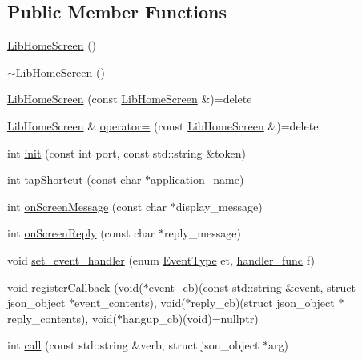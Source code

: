 \subsection*{Public Member Functions}
\begin{DoxyCompactItemize}
\item 
\hyperlink{class_lib_home_screen_a724bd949c4154fad041f96a15ef0f5dc}{Lib\+Home\+Screen} ()
\item 
\hyperlink{class_lib_home_screen_a249902aebf71a5383ca8ec6ae558d095}{$\sim$\+Lib\+Home\+Screen} ()
\item 
\hyperlink{class_lib_home_screen_a0fff2f703c8ce184eb9edd133e0f4137}{Lib\+Home\+Screen} (const \hyperlink{class_lib_home_screen}{Lib\+Home\+Screen} \&)=delete
\item 
\hyperlink{class_lib_home_screen}{Lib\+Home\+Screen} \& \hyperlink{class_lib_home_screen_a23bc17798453cfca50904562736f6b25}{operator=} (const \hyperlink{class_lib_home_screen}{Lib\+Home\+Screen} \&)=delete
\item 
int \hyperlink{class_lib_home_screen_a6a57b573cc767725762ba9beab032220}{init} (const int port, const std\+::string \&token)
\item 
int \hyperlink{class_lib_home_screen_afb571c9577087b47065eb23e7fdbc903}{tap\+Shortcut} (const char $\ast$application\+\_\+name)
\item 
int \hyperlink{class_lib_home_screen_ac336482036a72b51a822725f1929523c}{on\+Screen\+Message} (const char $\ast$display\+\_\+message)
\item 
int \hyperlink{class_lib_home_screen_a6c065f41f2c5d1f58d2763bfb4da9c37}{on\+Screen\+Reply} (const char $\ast$reply\+\_\+message)
\item 
void \hyperlink{class_lib_home_screen_ab1b0e08bf35415de9064afed899e9f85}{set\+\_\+event\+\_\+handler} (enum \hyperlink{class_lib_home_screen_a82616c91ac211d2ad08e709b524bf154}{Event\+Type} et, \hyperlink{class_lib_home_screen_a334f11f81c84c98d18284215dcaada3a}{handler\+\_\+func} f)
\item 
void \hyperlink{class_lib_home_screen_a2789e8a5372202cc36f48e71dbb9b7cf}{register\+Callback} (void($\ast$event\+\_\+cb)(const std\+::string \&\hyperlink{structevent}{event}, struct json\+\_\+object $\ast$event\+\_\+contents), void($\ast$reply\+\_\+cb)(struct json\+\_\+object $\ast$reply\+\_\+contents), void($\ast$hangup\+\_\+cb)(void)=nullptr)
\item 
int \hyperlink{class_lib_home_screen_a527b49dcfe581be6275d0eb2236ba37f}{call} (const std\+::string \&verb, struct json\+\_\+object $\ast$arg)

\end{DoxyCompactItemize}
